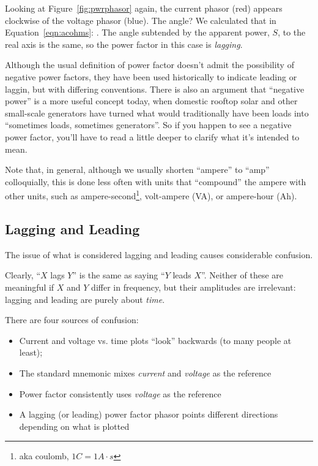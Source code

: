 \documentclass[11pt]{article}
\begin{document}
Looking at Figure~\ref{fig:pwrphasor} again, the current phasor (red)
appears clockwise of the voltage phasor (blue). The angle? We
calculated that in Equation~\ref{eqn:acohms}: \ruArgZ. The angle
subtended by the apparent power, $S$, to the real axis is the same, so
the power factor in this case is \rnPF \emph{lagging}.

Although the usual definition of power factor doesn't admit the
possibility of negative power factors, they have been used
historically to indicate leading or laggin, but with differing
conventions. There is also an argument that ``negative power'' is a
more useful concept today, when domestic rooftop solar and other
small-scale generators have turned what would traditionally have been
loads into ``sometimes loads, sometimes generators''. So if you happen
to see a negative power factor, you'll have to read a little deeper to
clarify what it's intended to mean.

Note that, in general, although we usually shorten ``ampere'' to
``amp'' colloquially, this is done less often with units that
``compound'' the ampere with other units, such as
ampere-second\footnote{aka coulomb, $1\unit{C}=1\unit{A\cdot s}$},
volt-ampere (\unit{VA}), or ampere-hour (\unit{Ah}).


\subsection{Lagging and Leading}

The issue of what is considered lagging and leading causes
considerable confusion.

Clearly, ``$X$ lags $Y$'' is the same as saying ``$Y$ leads
$X$''. Neither of these are meaningful if $X$ and $Y$ differ in
frequency, but their amplitudes are irrelevant: lagging and leading
are purely about \emph{time}.

There are four sources of confusion:
\begin{itemize}
  \item Current and voltage vs. time plots ``look'' backwards (to many people at least);
  \item The standard mnemonic mixes \emph{current} and \emph{voltage} as the reference
  \item Power factor consistently uses \emph{voltage} as the reference
  \item A lagging (or leading) power factor phasor points different
    directions depending on what is plotted
\end{itemize}
\end{document}
